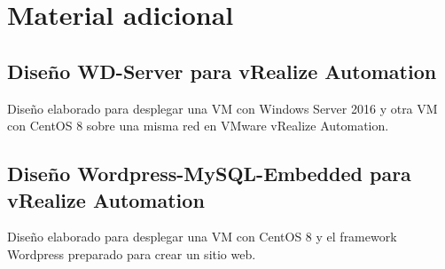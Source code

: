 \chapter{Material adicional}
\label{chap:adicional}

% 
\section{Diseño WD-Server para vRealize Automation}
\label{appendix:wd-server-blueprint}
Diseño elaborado para desplegar una VM con Windows Server 2016 y otra VM con CentOS 8 sobre una misma red en VMware vRealize Automation.


\section{Diseño Wordpress-MySQL-Embedded para vRealize Automation}
\label{appendix:worpress-mysql-blueprint}
Diseño elaborado para desplegar una VM con CentOS 8 y el framework Wordpress preparado para crear un sitio web.
